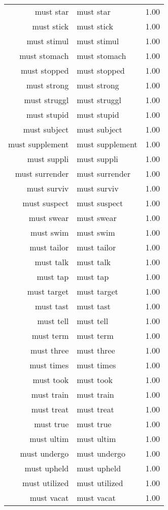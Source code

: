 \begin{table}[ht]
\begin{tabular}{rlr}
  must star & must star & 1.00 \\ 
  must stick & must stick & 1.00 \\ 
  must stimul & must stimul & 1.00 \\ 
  must stomach & must stomach & 1.00 \\ 
  must stopped & must stopped & 1.00 \\ 
  must strong & must strong & 1.00 \\ 
  must struggl & must struggl & 1.00 \\ 
  must stupid & must stupid & 1.00 \\ 
  must subject & must subject & 1.00 \\ 
  must supplement & must supplement & 1.00 \\ 
  must suppli & must suppli & 1.00 \\ 
  must surrender & must surrender & 1.00 \\ 
  must surviv & must surviv & 1.00 \\ 
  must suspect & must suspect & 1.00 \\ 
  must swear & must swear & 1.00 \\ 
  must swim & must swim & 1.00 \\ 
  must tailor & must tailor & 1.00 \\ 
  must talk & must talk & 1.00 \\ 
  must tap & must tap & 1.00 \\ 
  must target & must target & 1.00 \\ 
  must tast & must tast & 1.00 \\ 
  must tell & must tell & 1.00 \\ 
  must term & must term & 1.00 \\ 
  must three & must three & 1.00 \\ 
  must times & must times & 1.00 \\ 
  must took & must took & 1.00 \\ 
  must train & must train & 1.00 \\ 
  must treat & must treat & 1.00 \\ 
  must true & must true & 1.00 \\ 
  must ultim & must ultim & 1.00 \\ 
  must undergo & must undergo & 1.00 \\ 
  must upheld & must upheld & 1.00 \\ 
  must utilized & must utilized & 1.00 \\ 
  must vacat & must vacat & 1.00 \\ 

\end{tabular}
\end{table}

